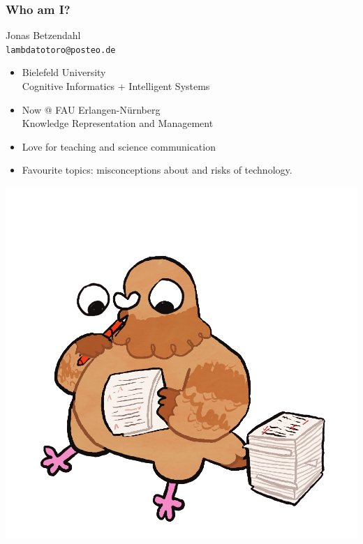 \documentclass[aspectratio=1610,dvipsnames]{beamer}
\begin{document}
\begin{frame}
\frametitle{Who am I?}
\begin{minipage}{0.6\textwidth}
\Large Jonas Betzendahl\normalsize\\
\texttt{lambdatotoro@posteo.de}
\bigskip

\begin{itemize}
\item Bielefeld University\\Cognitive Informatics + Intelligent Systems
\item Now @ FAU Erlangen-Nürnberg\\Knowledge Representation and Management
\item Love for teaching and science communication
\item Favourite topics: misconceptions about and risks of technology.
\end{itemize}

\end{minipage}%
\begin{minipage}{0.4\textwidth}
\begin{center}
\includegraphics[scale=0.15,keepaspectratio]{images/pigeon_jonas}
\end{center}
\end{minipage}
\end{frame}
\end{document}
